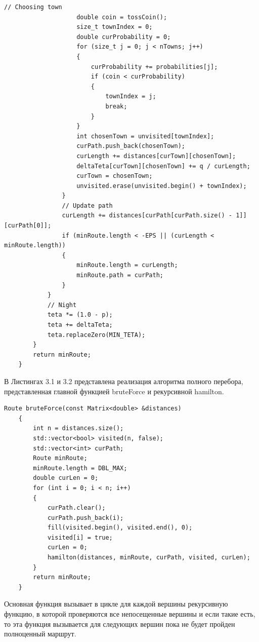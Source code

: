 \documentclass[a4paper,12pt]{report}
\begin{document}
\begin{lstlisting}[caption=Функция муравьиного поиска кратчайшего пути]
                    // Choosing town
                    double coin = tossCoin();
                    size_t townIndex = 0;
                    double curProbability = 0;
                    for (size_t j = 0; j < nTowns; j++)
                    {
                        curProbability += probabilities[j];
                        if (coin < curProbability)
                        {
                            townIndex = j;
                            break;
                        }
                    }
                    int chosenTown = unvisited[townIndex];
                    curPath.push_back(chosenTown);
                    curLength += distances[curTown][chosenTown];
                    deltaTeta[curTown][chosenTown] += q / curLength;
                    curTown = chosenTown;
                    unvisited.erase(unvisited.begin() + townIndex);
                }
                // Update path
                curLength += distances[curPath[curPath.size() - 1]][curPath[0]];
                if (minRoute.length < -EPS || (curLength < minRoute.length))
                {
                    minRoute.length = curLength;
                    minRoute.path = curPath;
                }
            }
            // Night
            teta *= (1.0 - p);
            teta += deltaTeta;
            teta.replaceZero(MIN_TETA);
        }
        return minRoute;
    }
\end{lstlisting}

В Листингах 3.1 и 3.2 представлена реализация алгоритма полного перебора, представленная главной функцией bruteForce и рекурсивной hamilton.
\begin{lstlisting}[caption=Главная функция алгоритма полного перебора]
    Route bruteForce(const Matrix<double> &distances)
    {
        int n = distances.size();
        std::vector<bool> visited(n, false);
        std::vector<int> curPath;
        Route minRoute;
        minRoute.length = DBL_MAX;
        double curLen = 0;
        for (int i = 0; i < n; i++)
        {
            curPath.clear();
            curPath.push_back(i);
            fill(visited.begin(), visited.end(), 0);
            visited[i] = true;
            curLen = 0;
            hamilton(distances, minRoute, curPath, visited, curLen);
        }
        return minRoute;
    }
\end{lstlisting}

 Основная функция вызывает в цикле для каждой вершины рекурсивную функцию, в которой проверяются все непосещенные вершины и если такие есть, то эта  функция вызывается для следующих вершин пока не будет пройден полноценный маршрут.
\end{document}
